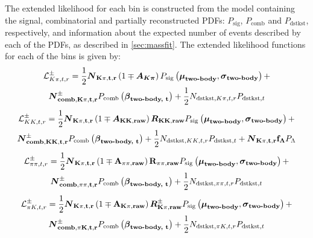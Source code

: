 The extended likelihood for each bin is constructed from the model containing the signal, combinatorial and partially reconstructed PDFs: $P_{\text{sig}}$, $P_{\text{comb}}$ and $P_{\text{dstkst}}$, respectively, and information about the expected number of events described by each of the PDFs, as described in \sect\ref{sec:massfit}. The extended likelihood functions for each of the bins is given by:
\begin{multline}
\mathcal{L}_{K\pi, t, r}^{\pm} = \frac{1}{2}\mathbf{\boldsymbol N_{K\pi, t, r}}\left(1 \mp \mathbf{\boldsymbol {A_{K\pi}}}\right)P_{\text{sig}}\left(\mathbf{\boldsymbol\mu_\text{\textbf{two-body}}},\mathbf{\boldsymbol\sigma_\text{\textbf{two-body}}}\right) + \\ \mathbf{\boldsymbol N_{\textbf{comb}, K\pi, t, r}^{\pm}}P_{\text{comb}}\left(\mathbf{\boldsymbol\beta_\text{\textbf{two-body, t}}}\right) + \frac{1}{2}N_{\text{dstkst}, K\pi, t, r}P_{\text{dstkst}, t}
\label{kpilikelihood}
\end{multline}
\begin{multline}
\mathcal{L}_{KK, t, r}^{\pm} = \frac{1}{2}\mathbf{\boldsymbol N_{K\pi, t, r}}\left(1 \mp \mathbf{\boldsymbol A_{KK, raw}}\right)\mathbf{\boldsymbol R_{KK, raw}} P_{\text{sig}}\left(\mathbf{\boldsymbol\mu_\text{\textbf{two-body}}},\mathbf{\boldsymbol\sigma_\text{\textbf{two-body}}}\right) + \\ \mathbf{\boldsymbol N_{\textbf{comb}, KK, t, r}^{\pm}}P_{\text{comb}}\left(\mathbf{\boldsymbol\beta_\text{\textbf{two-body, t}}}\right) + \frac{1}{2}N_{\text{dstkst}, KK, t, r}P_{\text{dstkst}, t} + \mathbf{\boldsymbol N_{K\pi, t, r}}\mathbf{f_{\Lambda}}P_{\Lambda}
\end{multline}
\begin{multline}
\mathcal{L}_{\pi\pi, t, r}^{\pm} = \frac{1}{2}\mathbf{\boldsymbol N_{K\pi, t, r}}\left(1 \mp \mathbf{A_{\pi\pi, raw}}\right)\mathbf{R_{\pi\pi, raw}} P_{\text{sig}}\left(\mathbf{\boldsymbol\mu_\text{\textbf{two-body}}},\mathbf{\boldsymbol\sigma_\text{\textbf{two-body}}}\right) + \\ \mathbf{\boldsymbol N_{\textbf{comb}, \pi\pi, t, r}^{\pm}}P_{\text{comb}}\left(\mathbf{\boldsymbol\beta_\text{\textbf{two-body, t}}}\right) + \frac{1}{2}N_{\text{dstkst}, \pi\pi, t, r}P_{\text{dstkst}, t}
\end{multline}
\begin{multline}
\mathcal{L}_{\pi K, t, r}^{\pm} = \frac{1}{2}\mathbf{\boldsymbol N_{K\pi, t, r}}\left(1 \mp \mathbf{A_{K\pi, raw}}\right)\mathbf{\boldsymbol R_{K\pi, raw}^{\pm}} P_{\text{sig}}\left(\mathbf{\boldsymbol\mu_\text{\textbf{two-body}}},\mathbf{\boldsymbol\sigma_\text{\textbf{two-body}}}\right) + \\ \mathbf{\boldsymbol N_{\textbf{comb}, \pi K, t, r}^{\pm}}P_{\text{comb}}\left(\mathbf{\boldsymbol\beta_\text{\textbf{two-body, t}}}\right) + \frac{1}{2}N_{\text{dstkst}, \pi K, t, r}P_{\text{dstkst}, t}
\end{multline}
